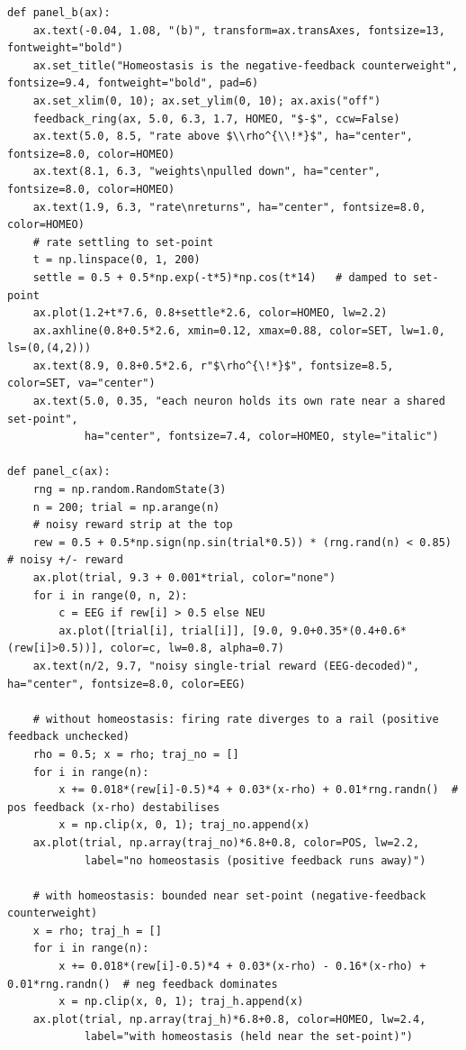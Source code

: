 \begin{lstlisting}[caption={schematics.ipynb code cell 9},label={lst:mrl-nb-schematics-9}]
def panel_b(ax):
    ax.text(-0.04, 1.08, "(b)", transform=ax.transAxes, fontsize=13, fontweight="bold")
    ax.set_title("Homeostasis is the negative-feedback counterweight", fontsize=9.4, fontweight="bold", pad=6)
    ax.set_xlim(0, 10); ax.set_ylim(0, 10); ax.axis("off")
    feedback_ring(ax, 5.0, 6.3, 1.7, HOMEO, "$-$", ccw=False)
    ax.text(5.0, 8.5, "rate above $\\rho^{\\!*}$", ha="center", fontsize=8.0, color=HOMEO)
    ax.text(8.1, 6.3, "weights\npulled down", ha="center", fontsize=8.0, color=HOMEO)
    ax.text(1.9, 6.3, "rate\nreturns", ha="center", fontsize=8.0, color=HOMEO)
    # rate settling to set-point
    t = np.linspace(0, 1, 200)
    settle = 0.5 + 0.5*np.exp(-t*5)*np.cos(t*14)   # damped to set-point
    ax.plot(1.2+t*7.6, 0.8+settle*2.6, color=HOMEO, lw=2.2)
    ax.axhline(0.8+0.5*2.6, xmin=0.12, xmax=0.88, color=SET, lw=1.0, ls=(0,(4,2)))
    ax.text(8.9, 0.8+0.5*2.6, r"$\rho^{\!*}$", fontsize=8.5, color=SET, va="center")
    ax.text(5.0, 0.35, "each neuron holds its own rate near a shared set-point",
            ha="center", fontsize=7.4, color=HOMEO, style="italic")

def panel_c(ax):
    rng = np.random.RandomState(3)
    n = 200; trial = np.arange(n)
    # noisy reward strip at the top
    rew = 0.5 + 0.5*np.sign(np.sin(trial*0.5)) * (rng.rand(n) < 0.85)  # noisy +/- reward
    ax.plot(trial, 9.3 + 0.001*trial, color="none")
    for i in range(0, n, 2):
        c = EEG if rew[i] > 0.5 else NEU
        ax.plot([trial[i], trial[i]], [9.0, 9.0+0.35*(0.4+0.6*(rew[i]>0.5))], color=c, lw=0.8, alpha=0.7)
    ax.text(n/2, 9.7, "noisy single-trial reward (EEG-decoded)", ha="center", fontsize=8.0, color=EEG)

    # without homeostasis: firing rate diverges to a rail (positive feedback unchecked)
    rho = 0.5; x = rho; traj_no = []
    for i in range(n):
        x += 0.018*(rew[i]-0.5)*4 + 0.03*(x-rho) + 0.01*rng.randn()  # pos feedback (x-rho) destabilises
        x = np.clip(x, 0, 1); traj_no.append(x)
    ax.plot(trial, np.array(traj_no)*6.8+0.8, color=POS, lw=2.2,
            label="no homeostasis (positive feedback runs away)")

    # with homeostasis: bounded near set-point (negative-feedback counterweight)
    x = rho; traj_h = []
    for i in range(n):
        x += 0.018*(rew[i]-0.5)*4 + 0.03*(x-rho) - 0.16*(x-rho) + 0.01*rng.randn()  # neg feedback dominates
        x = np.clip(x, 0, 1); traj_h.append(x)
    ax.plot(trial, np.array(traj_h)*6.8+0.8, color=HOMEO, lw=2.4,
            label="with homeostasis (held near the set-point)")


\end{lstlisting}
